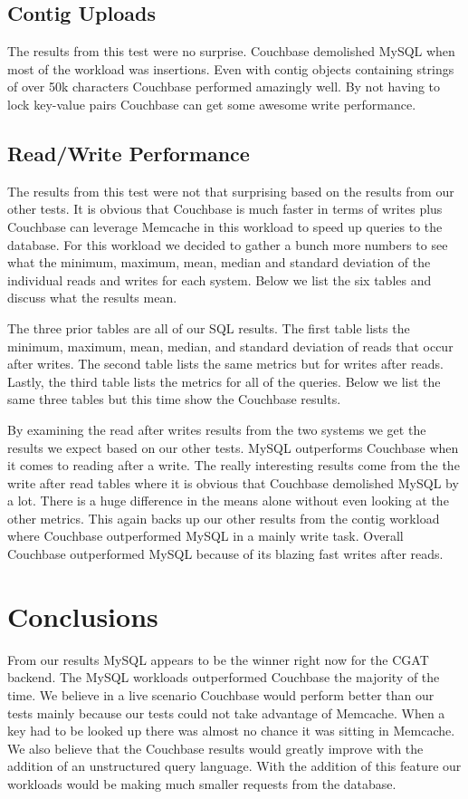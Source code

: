 \documentclass[10pt, conference, compsocconf]{IEEEtran}
\begin{document}
\subsection{Contig Uploads}
The results from this test were no surprise. Couchbase demolished MySQL when
most of the workload was insertions. Even with contig objects containing
strings of over 50k characters Couchbase performed amazingly well. By not
having to lock key-value pairs Couchbase can get some awesome write
performance.

\subsection{Read/Write Performance}
The results from this test were not that surprising based on the results from
our other tests. It is obvious that Couchbase is much faster in terms of writes
plus Couchbase can leverage Memcache in this workload to speed up queries to
the database. For this workload we decided to gather a bunch more numbers to
see what the minimum, maximum, mean, median and standard deviation of the
individual reads and writes for each system. Below we list the six tables and
discuss what the results mean.

The three prior tables are all of our SQL results. The first table lists the
minimum, maximum, mean, median, and standard deviation of reads that occur
after writes. The second table lists the same metrics but for writes after
reads. Lastly, the third table lists the metrics for all of the queries. Below
we list the same three tables but this time show the Couchbase results.

By examining the read after writes results from the two systems we get the
results we expect based on our other tests. MySQL outperforms Couchbase when it
comes to reading after a write. The really interesting results come from the
the write after read tables where it is obvious that Couchbase demolished MySQL
by a lot. There is a huge difference in the means alone without even looking at
the other metrics. This again backs up our other results from the contig
workload where Couchbase outperformed MySQL in a mainly write task. Overall
Couchbase outperformed MySQL because of its blazing fast writes after reads.

\section{Conclusions}\label{sec:conclusions}
From our results MySQL appears to be the winner right now for the CGAT backend.
The MySQL workloads outperformed Couchbase the majority of the time. We believe
in a live scenario Couchbase would perform better than our tests mainly because
our tests could not take advantage of Memcache. When a key had to be looked up
there was almost no chance it was sitting in Memcache. We also believe that the
Couchbase results would greatly improve with the addition of an unstructured
query language. With the addition of this feature our workloads would be making
much smaller requests from the database.
\end{document}
